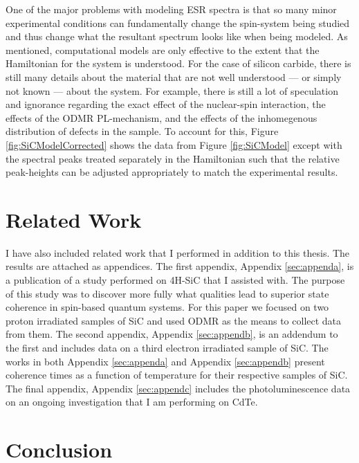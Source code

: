 \documentclass[oneside]{BYUPhys}
\begin{document}
One of the major problems with modeling ESR spectra is that so many minor experimental conditions can fundamentally change the spin-system being studied and thus change what the resultant spectrum looks like when being modeled. As mentioned, computational models are only effective to the extent that the Hamiltonian for the system is understood. For the case of silicon carbide, there is still many details about the material that are not well understood --- or simply not known --- about the system. For example, there is still a lot of speculation and ignorance regarding the exact effect of the nuclear-spin interaction, the effects of the ODMR PL-mechanism, and the effects of the inhomegenous distribution of defects in the sample. To account for this, Figure \ref{fig:SiCModelCorrected} shows the data from Figure \ref{fig:SiCModel} except with the spectral peaks treated separately in the Hamiltonian such that the relative peak-heights can be adjusted appropriately to match the experimental results.

\section{Related Work}

I have also included related work that I performed in addition to this thesis. The results are attached as appendices. The first appendix, Appendix \ref{sec:appenda}, is a publication of a study performed on 4H-SiC that I assisted with. The purpose of this study was to discover more fully what qualities lead to superior state coherence in spin-based quantum systems. For this paper we focused on two proton irradiated samples of SiC and used ODMR as the means to collect data from them. The second appendix, Appendix \ref{sec:appendb}, is an addendum to the first and includes data on a third electron irradiated sample of SiC. The works in both Appendix \ref{sec:appenda} and Appendix \ref{sec:appendb} present coherence times as a function of temperature for their respective samples of SiC. The final appendix, Appendix \ref{sec:appendc} includes the photoluminescence data on an ongoing investigation that I am performing on CdTe.

\section{Conclusion}
\end{document}
